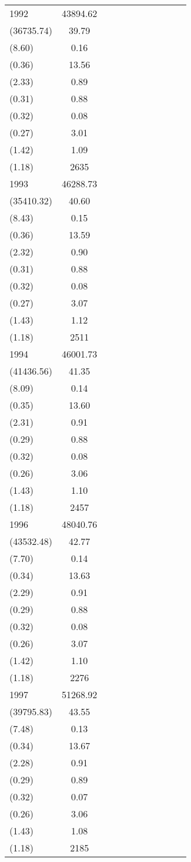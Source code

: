 \begin{table}[htbp]
\begin{tabular}{l*{9}{c}c}
1992 & 43894.62\\(36735.74) & 39.79\\(8.60) & 0.16\\(0.36) & 13.56\\(2.33) & 0.89\\(0.31) & 0.88\\(0.32) & 0.08\\(0.27) & 3.01\\(1.42) & 1.09\\(1.18) & 2635 \\
1993 & 46288.73\\(35410.32) & 40.60\\(8.43) & 0.15\\(0.36) & 13.59\\(2.32) & 0.90\\(0.31) & 0.88\\(0.32) & 0.08\\(0.27) & 3.07\\(1.43) & 1.12\\(1.18) & 2511 \\
1994 & 46001.73\\(41436.56) & 41.35\\(8.09) & 0.14\\(0.35) & 13.60\\(2.31) & 0.91\\(0.29) & 0.88\\(0.32) & 0.08\\(0.26) & 3.06\\(1.43) & 1.10\\(1.18) & 2457 \\
1996 & 48040.76\\(43532.48) & 42.77\\(7.70) & 0.14\\(0.34) & 13.63\\(2.29) & 0.91\\(0.29) & 0.88\\(0.32) & 0.08\\(0.26) & 3.07\\(1.42) & 1.10\\(1.18) & 2276 \\
1997 & 51268.92\\(39795.83) & 43.55\\(7.48) & 0.13\\(0.34) & 13.67\\(2.28) & 0.91\\(0.29) & 0.89\\(0.32) & 0.07\\(0.26) & 3.06\\(1.43) & 1.08\\(1.18) & 2185 \\
\hline
\end{tabular}
\end{table}

